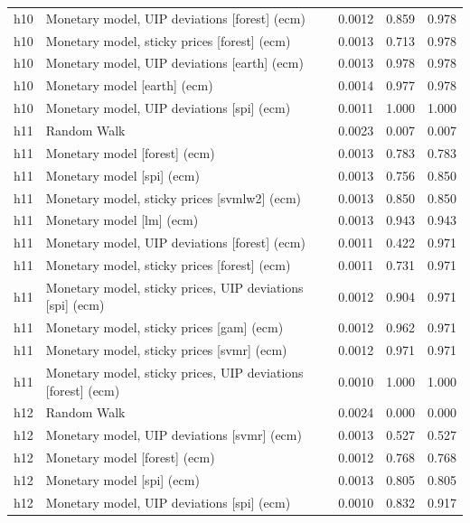 \begin{ThreePartTable}
\begin{longtable}[t]{cp{5.5cm}ccc}
h10 & \raggedright Monetary model, UIP deviations [forest] (ecm) & 0.0012 & 0.859 & 0.978\\
h10 & \raggedright Monetary model, sticky prices [forest] (ecm) & 0.0013 & 0.713 & 0.978\\
h10 & \raggedright Monetary model, UIP deviations [earth] (ecm) & 0.0013 & 0.978 & 0.978\\
h10 & \raggedright Monetary model [earth] (ecm) & 0.0014 & 0.977 & 0.978\\
h10 & \raggedright Monetary model, UIP deviations [spi] (ecm) & 0.0011 & 1.000 & 1.000\\
\addlinespace
h11 & \raggedright Random Walk & 0.0023 & 0.007 & 0.007\\
h11 & \raggedright Monetary model [forest] (ecm) & 0.0013 & 0.783 & 0.783\\
h11 & \raggedright Monetary model [spi] (ecm) & 0.0013 & 0.756 & 0.850\\
h11 & \raggedright Monetary model, sticky prices [svmlw2] (ecm) & 0.0013 & 0.850 & 0.850\\
h11 & \raggedright Monetary model [lm] (ecm) & 0.0013 & 0.943 & 0.943\\
h11 & \raggedright Monetary model, UIP deviations [forest] (ecm) & 0.0011 & 0.422 & 0.971\\
h11 & \raggedright Monetary model, sticky prices [forest] (ecm) & 0.0011 & 0.731 & 0.971\\
h11 & \raggedright Monetary model, sticky prices, UIP deviations [spi] (ecm) & 0.0012 & 0.904 & 0.971\\
h11 & \raggedright Monetary model, sticky prices [gam] (ecm) & 0.0012 & 0.962 & 0.971\\
h11 & \raggedright Monetary model, sticky prices [svmr] (ecm) & 0.0012 & 0.971 & 0.971\\
h11 & \raggedright Monetary model, sticky prices, UIP deviations [forest] (ecm) & 0.0010 & 1.000 & 1.000\\
\addlinespace
h12 & \raggedright Random Walk & 0.0024 & 0.000 & 0.000\\
h12 & \raggedright Monetary model, UIP deviations [svmr] (ecm) & 0.0013 & 0.527 & 0.527\\
h12 & \raggedright Monetary model [forest] (ecm) & 0.0012 & 0.768 & 0.768\\
h12 & \raggedright Monetary model [spi] (ecm) & 0.0013 & 0.805 & 0.805\\
h12 & \raggedright Monetary model, UIP deviations [spi] (ecm) & 0.0010 & 0.832 & 0.917\\

\end{longtable}
\end{ThreePartTable}
